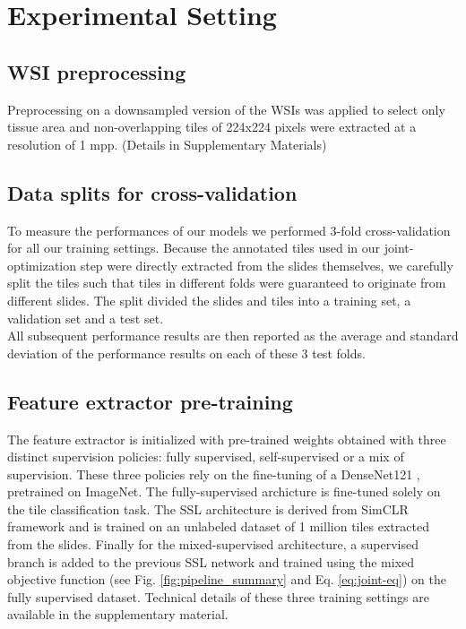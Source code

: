 \section{Experimental Setting}

\subsection{WSI preprocessing}

Preprocessing on a downsampled version of the WSIs was applied to select only tissue area and non-overlapping tiles of 224x224 pixels were extracted at a resolution of 1 mpp. (Details in Supplementary Materials)

\subsection{Data splits for cross-validation}
To measure the performances of our models we performed 3-fold cross-validation for all our training settings. Because the annotated tiles used in our joint-optimization step were directly extracted from the slides themselves, we carefully split the tiles such that tiles in different folds were guaranteed to originate from different slides. The split divided the slides and tiles into a training set, a validation set and a test set. \\ 
All subsequent performance results are then reported as the average and standard deviation of the performance results on each of these 3 test folds.

\subsection{Feature extractor pre-training}
The feature extractor is initialized with pre-trained weights obtained with three distinct supervision policies: fully supervised, self-supervised or a mix of supervision. These three policies rely on the fine-tuning of a DenseNet121 \citep{huang_densely_2016}, pretrained on ImageNet. The fully-supervised archicture is fine-tuned solely on the tile classification task. The SSL architecture is derived from SimCLR framework and is trained on an unlabeled dataset of 1 million tiles extracted from the slides. Finally for the mixed-supervised architecture, a supervised branch is added to the previous SSL network and trained using the mixed objective function (see Fig. \ref{fig:pipeline_summary} and Eq. \ref{eq:joint-eq}) on the fully supervised dataset. Technical details of these three training settings are available in the supplementary material.


